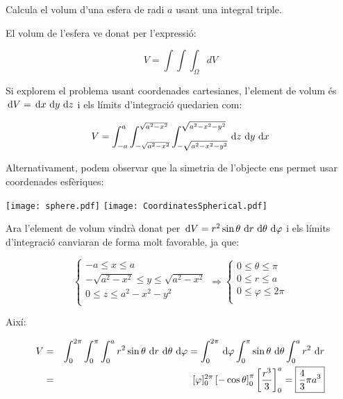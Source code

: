 \Exercise[title={Volum esfera}]

  Calcula el volum d'una esfera de radi $a$ usant una integral triple.


\Answer

El volum de l'esfera ve donat per l'expressió:

\[
  V=\int\int\int_{\Omega} dV 
\]



Si explorem el problema usant coordenades cartesianes, l'element de volum és $\, \mathop{}\!\mathrm{d} V= \, \mathop{}\!\mathrm{d} x \, \mathop{}\!\mathrm{d} y \, \mathop{}\!\mathrm{d} z$ i els límits d'integració quedarien com:

\[
  V=\int_{-a}^a  \int_{-\sqrt{a^2-x^2}}^{\sqrt{a^2-x^2}} \int_{-\sqrt{a^2-x^2-y^2}}^{\sqrt{a^2-x^2-y^2}} \, \mathop{}\!\mathrm{d} z \, \mathop{}\!\mathrm{d} y \, \mathop{}\!\mathrm{d} x 
\]

Alternativament, podem observar que la simetria de l'objecte ens permet usar coordenades esfèriques:

\begin{center}
  \texttt{[image: sphere.pdf]}
  \texttt{[image: CoordinatesSpherical.pdf]}
\end{center}

Ara l'element de volum vindrà donat per $\, \mathop{}\!\mathrm{d} V = r^2 \sin{\theta} \, \mathop{}\!\mathrm{d} r \, \mathop{}\!\mathrm{d} \theta \, \mathop{}\!\mathrm{d} \varphi$ i els límits d'integració canviaran de forma molt favorable, ja que:

\[
\begin{cases}
  -a \leq x \leq a\\
  -\sqrt{a^2-x^2} \leq y \leq \sqrt{a^2-x^2} \\
  0 \leq z \leq a^2-x^2 - y^2\\
\end{cases}  
\Rightarrow
\begin{cases}
  0 \leq \theta \leq \pi\\
  0 \leq r \leq a \\
  0 \leq \varphi \leq 2\pi\\
\end{cases}  
\]

Així:

\begin{eqnarray*}
  V&=&\int_{0}^{2\pi}  \int_{0}^{\pi} \int_0^{a} r^2 \sin{\theta} \, \mathop{}\!\mathrm{d} r \, \mathop{}\!\mathrm{d} \theta \, \mathop{}\!\mathrm{d} \varphi = \int_{0}^{2\pi} \, \mathop{}\!\mathrm{d} \varphi  \int_{0}^{\pi} \sin{\theta} \, \mathop{}\!\mathrm{d} \theta \int_0^{a} r^2  \, \mathop{}\!\mathrm{d} r   \\
  &=& [\varphi]_0^{2\pi} \left[-\cos{\theta}\right]_0^{\pi} \left[\frac{r^3}{3}\right]_0^a =\boxed{\frac{4}{3}\pi a^3}
\end{eqnarray*}

